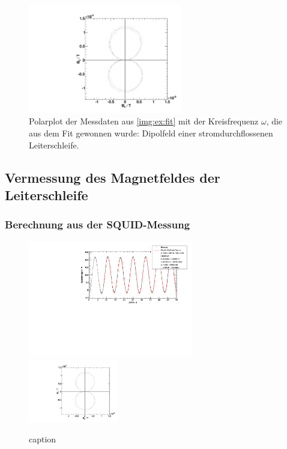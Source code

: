\begin{figure}[H]
\begin{center}
  \includegraphics[width=0.6\textwidth]{../img/polar_Spule_R1.pdf}
  \caption{Polarplot der Messdaten aus \autoref{img:ex:fit} mit der Kreisfrequenz $\omega$,
  die aus dem Fit gewonnen wurde: Dipolfeld einer stromdurchflossenen Leiterschleife.}
  \label{img:ex:polar}
\end{center}
\end{figure}

\subsection{Vermessung des Magnetfeldes der Leiterschleife}
\subsubsection{Berechnung aus der SQUID-Messung}
\begin{figure}[H]
\begin{center}
  \includegraphics[width=0.64\textwidth]{../img/fit_Spule_R1.pdf}
  \includegraphics[width=0.35\textwidth]{../img/polar_Spule_R1.pdf}
  \caption{caption}
  \label{img:R1}
\end{center}
\end{figure}

